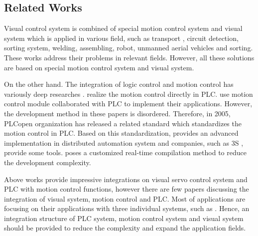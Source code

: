 \documentclass[journal,UTF8]{IEEEtran}
\begin{document}
\subsection{Related Works}

Visual control system is combined of special motion control system and visual system which is applied in various field, such as transport \cite{Xing2014Intersection}, circuit detection\cite{Nian2005An}, sorting system, welding\cite{Chen2014A}, assembling\cite{Wang2008Visual,Xiao2014Visual}, robot\cite{Wu2013Cloud,Tsai2017A}, unmanned aerial vehicles\cite{Guenard2010A,Serra2016Landing} and sorting\cite{Sun2013Automatic}. These works address their problems in relevant fields. However, all these solutions are based on special motion control system and visual system.


On the other hand. The integration of logic control and motion control has variously deep researches \cite{Ioannides2004Design,Shi2016The,Fang2017Design, syaichu2011model}. \cite{Ioannides2004Design,syaichu2011model} realize the motion control directly in PLC. \cite{Peng2011Linear, Qian2014A, OMRON2006CS1W} use motion control module collaborated with PLC to implement their applications. However, the development method in these papers is disordered. Therefore, in 2005, PLCopen organization has released a related standard \cite{PLCopen2005Function} which standardizes the motion control in PLC. Based on this standardization, \cite{S2006Advanced} provides an advanced implementation in distributed automation system and companies, such as 3S \cite{3S2017Logic}, provide some tools. \cite{wu2018customized} poses a customized real-time compilation method to reduce the development complexity.

Above works provide impressive integrations on visual servo control system and PLC with motion control functions, however there are few papers discussing the integration of visual system, motion control and PLC. Most of applications are focusing on their applications with three individual systems, such as \cite{Chen2014A}. Hence, an integration structure of PLC system, motion control system and visual system should be provided to reduce the complexity and expand the application fields.
\end{document}
